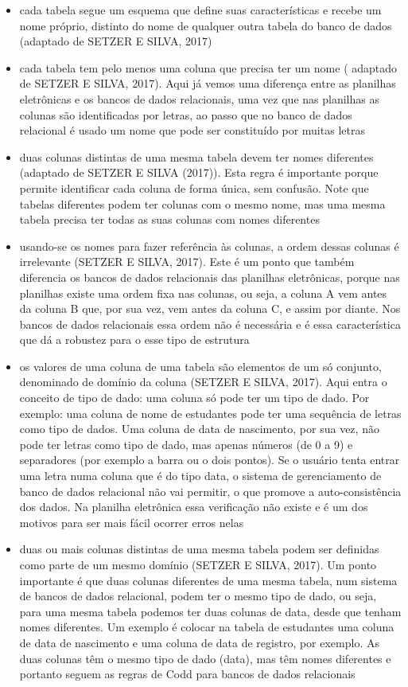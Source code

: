 \begin{itemize}
\item cada tabela segue um esquema que define suas características e recebe um nome próprio, distinto do nome de qualquer outra tabela do banco de dados (adaptado de SETZER E SILVA, 2017)
\item cada tabela tem pelo menos uma coluna que precisa ter um nome ( adaptado de SETZER E SILVA, 2017). Aqui já vemos uma diferença entre as planilhas eletrônicas e os bancos de dados relacionais, uma vez que nas planilhas as colunas são identificadas por letras, ao passo que no banco de dados relacional é usado um nome que pode ser constituído por muitas letras
\item duas colunas distintas de uma mesma tabela devem ter nomes diferentes (adaptado de SETZER E SILVA (2017)). Esta regra é importante porque permite identificar cada coluna de forma única, sem confusão. Note que tabelas diferentes podem ter colunas com o mesmo nome, mas uma mesma tabela precisa ter todas as suas colunas com nomes diferentes
\item usando-se os nomes para fazer referência às colunas, a ordem dessas colunas é irrelevante  (SETZER E SILVA, 2017). Este é um ponto que também diferencia os bancos de dados relacionais das planilhas eletrônicas, porque nas planilhas existe uma ordem fixa nas colunas, ou seja, a coluna A vem antes da coluna B que, por sua vez, vem antes da coluna C, e assim por diante. Nos bancos de dados relacionais essa ordem não é necessária e é essa característica que dá a robustez para o esse tipo de estrutura
\item os valores de uma coluna de uma tabela são elementos de um só conjunto, denominado de domínio da coluna  (SETZER E SILVA, 2017). Aqui entra o conceito de tipo de dado: uma coluna só pode ter um tipo de dado. Por exemplo: uma coluna de nome de estudantes pode ter uma sequência de letras como tipo de dados. Uma coluna de data de nascimento, por sua vez, não pode ter letras como tipo de dado, mas apenas números (de 0 a 9) e separadores (por exemplo a barra ou o dois pontos). Se o usuário tenta entrar uma letra numa coluna que é do tipo data, o sistema de gerenciamento de banco de dados relacional não vai permitir, o que promove a auto-consistência dos dados. Na planilha eletrônica essa verificação não existe e é um dos motivos para ser mais fácil ocorrer erros nelas
\item duas ou mais colunas distintas de uma mesma tabela podem ser definidas como parte de um mesmo domínio  (SETZER E SILVA, 2017). Um ponto importante é que duas colunas diferentes de uma mesma tabela, num sistema de bancos de dados relacional, podem ter o mesmo tipo de dado, ou seja, para uma mesma tabela podemos ter duas colunas de data, desde que tenham nomes diferentes. Um exemplo é colocar na tabela de estudantes uma coluna de data de nascimento e uma coluna de data de registro, por exemplo. As duas colunas têm o mesmo tipo de dado (data), mas têm nomes diferentes e portanto seguem as regras de Codd para bancos de dados relacionais

\end{itemize}
